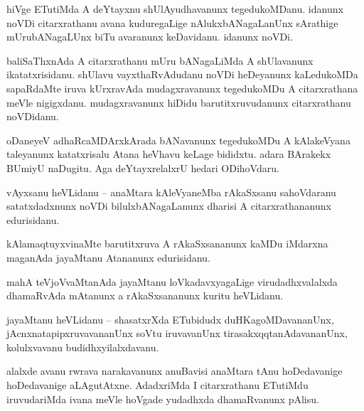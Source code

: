 \documentclass{article}
\begin{document}
\begin{mng}%
hiVge ETutiMda A deYtayxnu shUlAyudhavanunx tegedukoMDanu. idanunx noVDi citarxrathanu avana 
kuduregaLige nAlukxbANagaLanUnx sArathige mUrubANagaLUnx biTu avaranunx keDavidanu. idanunx noVDi.
\end{mng}

\begin{mng}%
baliSaThxnAda A citarxrathanu mUru bANagaLiMda A shUlavanunx ikatatxrisidanu. shUlavu 
vayxthaRvAdudanu noVDi heDeyanunx kaLedukoMDa sapaRdaMte iruva kUrxravAda mudagxravanunx 
tegedukoMDu A citarxrathana meVle nigigxdanu. mudagxravanunx hiDidu barutitxruvudanunx 
citarxrathanu noVDidanu.
\end{mng}

\begin{mng}%
oDaneyeV adhaRcaMDArxkArada bANavanunx tegedukoMDu A kAlakeVyana taleyanunx katatxrisalu Atana 
heVhavu keLage bididxtu. adara BArakekx BUmiyU naDugitu. Aga deYtayxrelalxrU hedari ODihoVdaru.
\end{mng}



\begin{mng}%
vAyxsanu heVLidanu -- anaMtara kAleVyaneMba rAkaSxsanu sahoVdaranu satatxdadxnunx noVDi 
bilulxbANagaLanunx dharisi A citarxrathananunx edurisidanu.
\end{mng}

\begin{mng}%
kAlamaqtuyxvinaMte barutitxruva A rAkaSxsananunx kaMDu iMdarxna maganAda jayaMtanu Atananunx 
edurisidanu.
\end{mng}

\begin{mng}%
mahA teVjoVvaMtanAda jayaMtanu loVkadavxyagaLige virudadhxvalalxda dhamaRvAda mAtanunx a 
rAkaSxsananunx kuritu heVLidanu.
\end{mng}

\begin{mng}%
jayaMtanu heVLidanu -- shasatxrXda ETubidudx duHKagoMDavananUnx, jAcnxnatapipxruvavananUnx soVtu 
iruvavanUnx tirasakxqqtanAdavananUnx, kolulxvavanu budidhxyilalxdavanu.
\end{mng}

\begin{mng}%
alalxde avanu rwrava narakavanunx anuBavisi anaMtara tAnu hoDedavanige hoDedavanige aLAgutAtxne. 
AdadxriMda I citarxrathanu ETutiMdu iruvudariMda ivana meVle hoVgade yudadhxda dhamaRvanunx pAlisu.
\end{mng}
\end{document}
